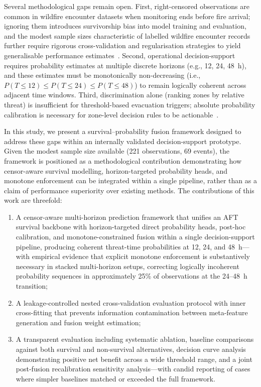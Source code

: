 \documentclass[fire,article,submit,pdftex]{../Definitions/mdpi}
\begin{document}
Several methodological gaps remain open.
First, right-censored observations are common in wildfire encounter datasets when monitoring ends before fire arrival; ignoring them introduces survivorship bias into model training and evaluation, and the modest sample sizes characteristic of labelled wildfire encounter records further require rigorous cross-validation and regularisation strategies to yield generalisable performance estimates~\cite{Steyerberg2019,Collins2024,Riley2020}.
Second, operational decision-support requires probability estimates at multiple discrete horizons (e.g., 12, 24, 48~h), and these estimates must be monotonically non-decreasing (i.e., $P(T \leq 12) \leq P(T \leq 24) \leq P(T \leq 48)$) to remain logically coherent across adjacent time windows.
Third, discrimination alone (ranking zones by relative threat) is insufficient for threshold-based evacuation triggers; absolute probability calibration is necessary for zone-level decision rules to be actionable~\cite{VanCalster2019}.

In this study, we present a survival--probability fusion framework designed to address these gaps within an internally validated decision-support prototype.
Given the modest sample size available (221 observations, 69 events), the framework is positioned as a methodological contribution demonstrating how censor-aware survival modelling, horizon-targeted probability heads, and monotone enforcement can be integrated within a single pipeline, rather than as a claim of performance superiority over existing methods.
The contributions of this work are threefold:
\begin{enumerate}
    \item A censor-aware multi-horizon prediction framework that unifies an AFT survival backbone with horizon-targeted direct probability heads, post-hoc calibration, and monotone-constrained fusion within a single decision-support pipeline, producing coherent threat-time probabilities at 12, 24, and 48~h---with empirical evidence that explicit monotone enforcement is substantively necessary in stacked multi-horizon setups, correcting logically incoherent probability sequences in approximately 25\% of observations at the 24--48~h transition;
    \item A leakage-controlled nested cross-validation evaluation protocol with inner cross-fitting that prevents information contamination between meta-feature generation and fusion weight estimation;
    \item A transparent evaluation including systematic ablation, baseline comparisons against both survival and non-survival alternatives, decision curve analysis demonstrating positive net benefit across a wide threshold range, and a joint post-fusion recalibration sensitivity analysis---with candid reporting of cases where simpler baselines matched or exceeded the full framework.
\end{enumerate}
\end{document}
